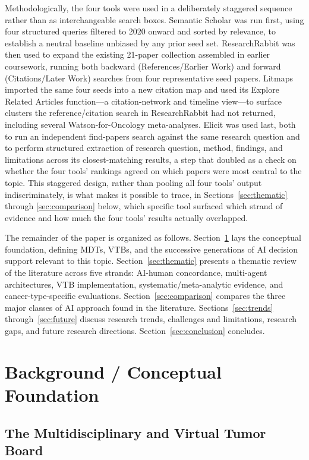 \documentclass{article}
\begin{document}
Methodologically, the four tools were used in a deliberately staggered sequence rather than as interchangeable search boxes. Semantic Scholar was run first, using four structured queries filtered to 2020 onward and sorted by relevance, to establish a neutral baseline unbiased by any prior seed set. ResearchRabbit was then used to expand the existing 21-paper collection assembled in earlier coursework, running both backward (References/Earlier Work) and forward (Citations/Later Work) searches from four representative seed papers. Litmaps imported the same four seeds into a new citation map and used its Explore Related Articles function---a citation-network and timeline view---to surface clusters the reference/citation search in ResearchRabbit had not returned, including several Watson-for-Oncology meta-analyses. Elicit was used last, both to run an independent find-papers search against the same research question and to perform structured extraction of research question, method, findings, and limitations across its closest-matching results, a step that doubled as a check on whether the four tools' rankings agreed on which papers were most central to the topic. This staggered design, rather than pooling all four tools' output indiscriminately, is what makes it possible to trace, in Sections~\ref{sec:thematic} through \ref{sec:comparison} below, which specific tool surfaced which strand of evidence and how much the four tools' results actually overlapped.

The remainder of the paper is organized as follows. Section~\ref{sec:background} lays the conceptual foundation, defining MDTs, VTBs, and the successive generations of AI decision support relevant to this topic. Section~\ref{sec:thematic} presents a thematic review of the literature across five strands: AI-human concordance, multi-agent architectures, VTB implementation, systematic/meta-analytic evidence, and cancer-type-specific evaluations. Section~\ref{sec:comparison} compares the three major classes of AI approach found in the literature. Sections~\ref{sec:trends} through~\ref{sec:future} discuss research trends, challenges and limitations, research gaps, and future research directions. Section~\ref{sec:conclusion} concludes.

\section{Background / Conceptual Foundation}
\label{sec:background}

\subsection{The Multidisciplinary and Virtual Tumor Board}
\end{document}

